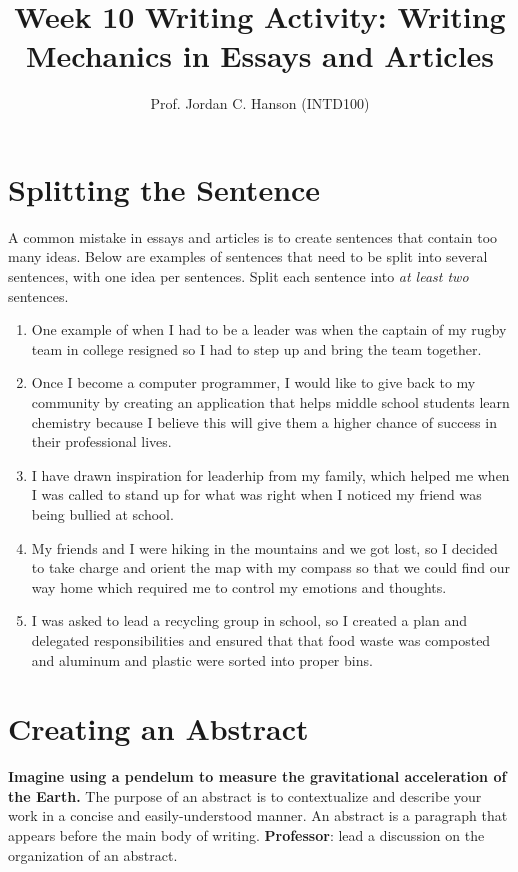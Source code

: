 \documentclass{article}
\begin{document}
\title{Week 10 Writing Activity: Writing Mechanics in Essays and Articles}
\author{Prof. Jordan C. Hanson (INTD100)}

\maketitle

\section{Splitting the Sentence}

A common mistake in essays and articles is to create sentences that contain too many ideas.  Below are examples of sentences that need to be split into several sentences, with one idea per sentences.  Split each sentence into \textit{at least two} sentences.

\begin{enumerate}
\item One example of when I had to be a leader was when the captain of my rugby team in college resigned so I had to step up and bring the team together. \\ \vspace{1cm}
\item Once I become a computer programmer, I would like to give back to my community by creating an application that helps middle school students learn chemistry because I believe this will give them a higher chance of success in their professional lives. \\ \vspace{1cm}
\item I have drawn inspiration for leaderhip from my family, which helped me when I was called to stand up for what was right when I noticed my friend was being bullied at school. \\ \vspace{1cm}
\item My friends and I were hiking in the mountains and we got lost, so I decided to take charge and orient the map with my compass so that we could find our way home which required me to control my emotions and thoughts. \\ \vspace{1cm}
\item I was asked to lead a recycling group in school, so I created a plan and delegated responsibilities and ensured that that food waste was composted and aluminum and plastic were sorted into proper bins.  \\ \vspace{1cm}
\end{enumerate}

\section{Creating an Abstract}

\textbf{Imagine using a pendelum to measure the gravitational acceleration of the Earth.}  The purpose of an abstract is to contextualize and describe your work in a concise and easily-understood manner.  An abstract is a paragraph that appears before the main body of writing.  \textbf{Professor}: lead a discussion on the organization of an abstract.
\end{document}
